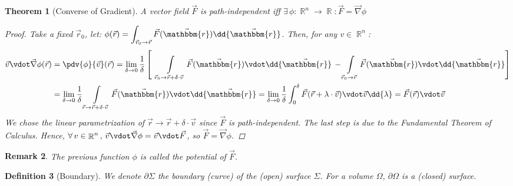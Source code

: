 \documentclass[12pt]{article}
\renewcommand{\grad}{\vec{\nabla}}
\newcommand{\Forall}[1]{\forall\,{#1}\,,\,}
\newcommand{\Exist}[1]{\exists\,{#1}:}
\DeclareMathOperator{\R}{\mathbb{R}}
\newcommand*{\rv}{\vec{r}}
\newcommand*{\vF}{\vec{F}}
\newcommand*{\irv}{\vec{\mathbbm{r}}}
\newtheorem{theorem}{Theorem}[subsection]
\newtheorem{definition}[theorem]{Definition}
\newtheorem{remark}[theorem]{Remark}
\begin{document}
\begin{theorem}[Converse of Gradient]
  \label{path_potential}
  A vector field $\vF$ is path-independent iff $\Exist{\phi:\R^n\to\R}\vF=\grad\phi$
  \begin{proof}
    Take a fixed $\rv_0$, let: $\displaystyle \phi(\rv)=\int_{\rv_0\to\rv}\vF(\irv)\dd{\irv}$. Then, for any $v\in\R^n$: 
    \begin{align*}
      \vec{v}\vdot\grad\phi(\rv)&=\pdv{\phi}{\vec{v}}(\rv)=\lim_{\delta\to 0}\frac{1}{\delta}\left[\;\;\int\limits_{\rv_0\to\rv+\delta\cdot\vec{v}}\vF(\irv)\vdot\dd{\irv}\,-\int\limits_{\rv_0\to\rv}\vF(\irv)\vdot\dd{\irv}\right]\\
      &=\lim_{\delta\to 0}\frac{1}{\delta}\int\limits_{\rv\to \rv+\delta\cdot\vec{v}}\vF(\irv)\vdot\dd{\irv}=\lim_{\delta\to 0}\frac{1}{\delta}\int_0^\delta \vF(\rv+\lambda\cdot\vec{v})\vdot\vec{v}\dd{\lambda}=\vF(\rv)\vdot\vec{v}
    \end{align*}
    We chose the linear parametrization of $\rv\to \rv+\delta\cdot\vec{v}$ since $\vF$ is path-independent. The last step is due to the Fundamental Theorem of Calculus. Hence, $\Forall{v\in\R^n}\vec{v}\vdot\grad\phi=\vec{v}\vdot\vF$, so $\vF=\grad\phi$.
  \end{proof}
\end{theorem}

\begin{remark}
  The previous function $\phi$ is called the potential of $\vF$.
\end{remark}

\begin{definition}[Boundary]
  We denote $\partial\Sigma$ the boundary (curve) of the (open) surface $\Sigma$. For a volume $\Omega$, $\partial\Omega$ is a (closed) surface.
\end{definition}
\end{document}
